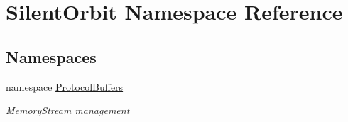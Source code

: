 \hypertarget{namespace_silent_orbit}{}\section{Silent\+Orbit Namespace Reference}
\label{namespace_silent_orbit}
\subsection*{Namespaces}
\begin{DoxyCompactItemize}
\item 
namespace \hyperlink{namespace_silent_orbit_1_1_protocol_buffers}{Protocol\+Buffers}
\begin{DoxyCompactList}\small\item\em Memory\+Stream management \end{DoxyCompactList}\end{DoxyCompactItemize}
